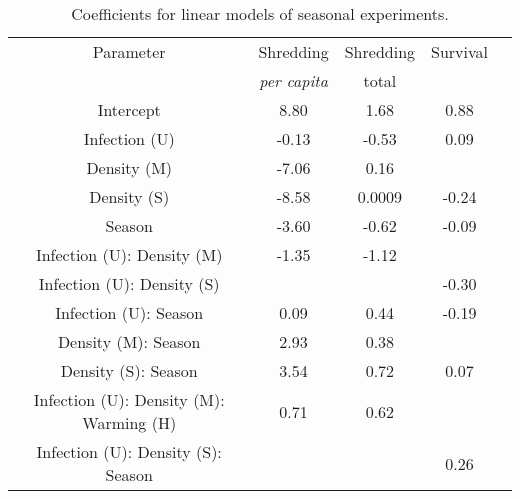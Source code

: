 \begin{table}
\caption [Coefficients for linear models of seasonal experiments.]{Coefficients for linear models of seasonal experiments.}
\centering
\begin{tabular}{ccccl}\toprule
Parameter                               & Shredding           & Shredding & Survival &  \\
                                        & \textit{per capita} & total     &          &  \\ \midrule
Intercept                               & 8.80                & 1.68      & 0.88     &  \\
Infection (U)                           & -0.13               & -0.53     & 0.09     &  \\
Density (M)                             & -7.06               & 0.16      &          &  \\
Density (S)                             & -8.58               & 0.0009    & -0.24    &  \\
Season                                  & -3.60               & -0.62     & -0.09    &  \\
Infection (U): Density (M)              & -1.35               & -1.12     &          &  \\
Infection (U): Density (S)              &                     &           & -0.30    &  \\
Infection (U): Season                   & 0.09                & 0.44      & -0.19    &  \\
Density (M): Season                     & 2.93                & 0.38      &          &  \\
Density (S): Season                     & 3.54                & 0.72      & 0.07     &  \\
Infection (U): Density (M): Warming (H) & 0.71                & 0.62      &          &  \\
Infection (U): Density (S): Season      &                     &           & 0.26     &  \\ \bottomrule
\end{tabular}
\end{table}